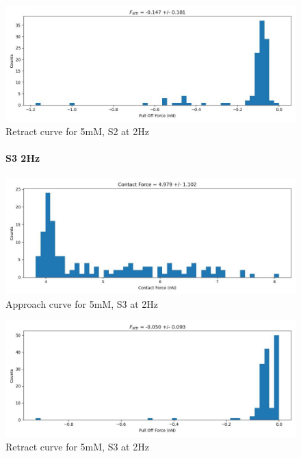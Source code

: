 \begin{figure}[h!]
\centering
\includegraphics[width=\textwidth]{chapter7/Tip speed/5mM/S2 2Hz/retract_f_a_hist.jpg}
\caption{Retract curve for 5mM, S2 at 2Hz}
\end{figure}
\newpage


\begin{figure}[h!]
\paragraph{S3 2Hz}
\centering
\includegraphics[width=\textwidth]{chapter7/Tip speed/5mM/S3 2Hz/approach_f_c_hist.jpg}
\caption{Approach curve for 5mM, S3 at 2Hz}
\end{figure}

\begin{figure}[h!]
\centering
\includegraphics[width=\textwidth]{chapter7/Tip speed/5mM/S3 2Hz/retract_f_a_hist.jpg}
\caption{Retract curve for 5mM, S3 at 2Hz}
\end{figure}
\newpage

